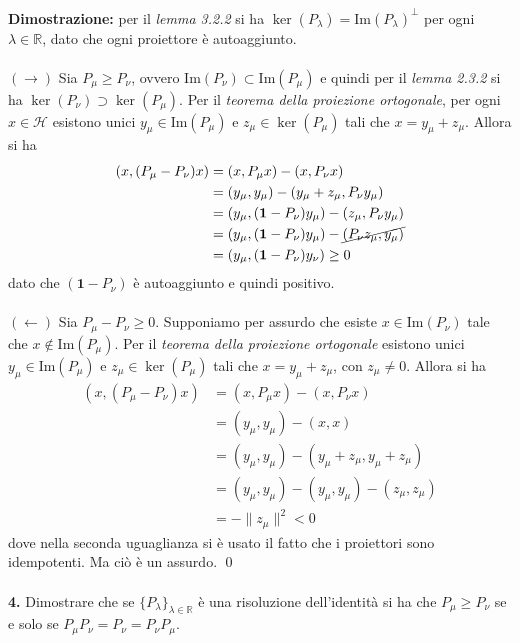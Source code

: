 \documentclass{article}
\numberwithin{equation}{subsection}
\begin{document}
\textbf{Dimostrazione:} per il \textit{lemma 3.2.2} si ha $\ker(P_\lambda) = \mathrm{Im}(P_\lambda)^\perp$ per ogni $\lambda \in \mathbb{R}$, dato che ogni proiettore è autoaggiunto. \\ \\
$(\rightarrow)$ Sia $P_\mu \geq P_\nu$, ovvero $\mathrm{Im}(P_\nu) \subset \mathrm{Im}(P_\mu)$ e quindi per il \textit{lemma 2.3.2} si ha $\ker(P_\nu) \supset \ker(P_\mu)$. Per il \textit{teorema della proiezione ortogonale}, per ogni $x \in \mathcal{H}$ esistono unici $y_\mu \in \mathrm{Im}(P_\mu)$ e $z_\mu \in \ker(P_\mu)$ tali che $x = y_\mu + z_\mu$. Allora si ha 
\begin{align*}
    (x, (P_\mu - P_\nu)x) &= (x, P_\mu x) - (x, P_\nu x)  \\
    &= (y_\mu, y_\mu) - (y_\mu + z_\mu, P_\nu y_\mu)  \\
    &= (y_\mu, (\mathbf{1} - P_\nu)y_\mu) - (z_\mu, P_\nu y_\mu)  \\
    &= (y_\mu, (\mathbf{1} - P_\nu)y_\mu) - \cancel{(P_\nu z_\mu, y_\mu)}  \\
    &= (y_\mu, (\mathbf{1} - P_\nu)y_\nu) \geq 0 
\end{align*}
dato che $(\mathbf{1} - P_\nu)$ è autoaggiunto e quindi positivo. \\ \\
$(\leftarrow)$ Sia $P_\mu - P_\nu \geq 0$. Supponiamo per assurdo che esiste $x \in \mathrm{Im}(P_\nu)$ tale che $x \not\in \mathrm{Im}(P_\mu)$. Per il \textit{teorema della proiezione ortogonale} esistono unici $y_\mu \in \mathrm{Im}(P_\mu)$ e $z_\mu \in \ker(P_\mu)$ tali che $x = y_\mu + z_\mu$, con $z_\mu \neq 0$. Allora si ha
\begin{align*}
    (x, (P_\mu - P_\nu)x) &= (x, P_\mu x) - (x, P_\nu x)  \\
    &= (y_\mu, y_\mu) - (x, x)  \\
    &= (y_\mu, y_\mu) - (y_\mu + z_\mu, y_\mu + z_\mu)  \\
    &= (y_\mu, y_\mu) - (y_\mu, y_\mu) - (z_\mu, z_\mu)  \\
    &= -\|z_\mu\|^2 < 0 
\end{align*}
dove nella seconda uguaglianza si è usato il fatto che i proiettori sono idempotenti. Ma ciò è un assurdo. \qed \\ \\
\textbf{4.} Dimostrare che se $\{P_\lambda\}_{\lambda \in \mathbb{R}}$ è una risoluzione dell'identità si ha che $P_\mu \geq P_\nu$ se e solo se $P_\mu P_\nu = P_\nu = P_\nu P_\mu$. \\
\end{document}
